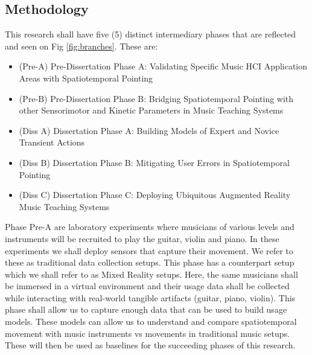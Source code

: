 \documentclass{article}
\begin{document}
\subsection{Methodology}
This research shall have five (5) distinct intermediary phases that are reflected and seen on Fig \ref{fig:branches}. These are:
\begin{itemize}
    \item (Pre-A) Pre-Dissertation Phase A: Validating Specific Music HCI Application Areas with Spatiotemporal Pointing
    \item (Pre-B) Pre-Dissertation Phase B: Bridging Spatiotemporal Pointing with other Sensorimotor and Kinetic Parameters in Music Teaching Systems
    \item (Diss A) Dissertation Phase A: Building Models of Expert and Novice Transient Actions
    \item (Diss B) Dissertation Phase B: Mitigating User Errors in Spatiotemporal Pointing
    \item (Diss C) Dissertation Phase C: Deploying Ubiquitous Augmented Reality Music Teaching Systems\\
\end{itemize}

Phase Pre-A are laboratory experiments where musicians of various levels and instruments will be recruited to play the guitar, violin and piano. In these experiments we shall deploy sensors that capture their movement. We refer to these as traditional data collection setups. This phase has a counterpart setup which we shall refer to as Mixed Reality setups. Here, the same musicians shall be immersed in a virtual environment and their usage data shall be collected while interacting with real-world tangible artifacts (guitar, piano, violin). This phase shall allow us to capture enough data that can be used to build usage models. These models can allow us to understand and compare spatiotemporal movement with music instruments vs movements in traditional music setups. These will then be used as baselines for the succeeding phases of this research. \\
\end{document}
